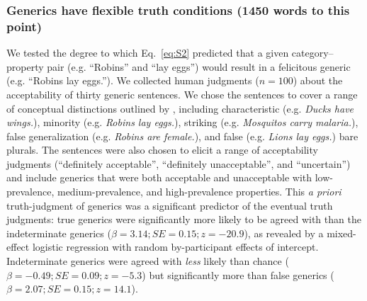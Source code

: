 \documentclass[10pt,letterpaper]{article}
\newcommand{\ndg}[1]{\textcolor{Green}{[ndg: #1]}}
\begin{document}




\subsubsection{Generics have flexible truth conditions (1450 words to this point)} 

We tested the degree to which Eq.~\eqref{eq:S2} predicted that a given category--property pair (e.g. ``Robins'' and ``lay eggs'') would result in a felicitous generic (e.g. ``Robins lay eggs.''). 
We collected human judgments ($n=100$) about the acceptability of thirty generic sentences. 
We chose the sentences to cover a range of conceptual distinctions outlined by , including characteristic (e.g. \emph{Ducks have wings.}), minority (e.g. \emph{Robins lay eggs.}), striking (e.g. \emph{Mosquitos carry malaria.}), false generalization (e.g. \emph{Robins are female.}), and false (e.g. \emph{Lions lay eggs.}) bare plurals.
The sentences were also chosen to elicit a range of acceptability judgments (``definitely acceptable'', ``definitely unacceptable'', and ``uncertain'') and include generics that were both acceptable and unacceptable with low-prevalence, medium-prevalence, and high-prevalence properties.
%
This \emph{a priori} truth-judgment of generics was a significant predictor of the eventual truth judgments: true generics were significantly more likely to be agreed with than the indeterminate generics ($\beta = 3.14; SE = 0.15; z = -20.9$), as revealed by a mixed-effect logistic regression with random by-participant effects of intercept.
Indeterminate generics were agreed with \emph{less} likely than chance ($\beta = -0.49; SE = 0.09; z = -5.3$) but significantly more than false generics ($\beta = 2.07; SE = 0.15; z = 14.1$).
\end{document}
